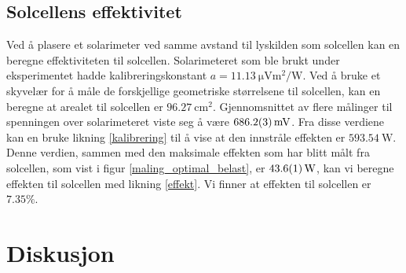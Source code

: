 \documentclass[%
 reprint,
 amsmath,amssymb,
 aps,
 norsk,
 booktabs
]{revtex4-1}
\begin{document}
\subsection{Solcellens effektivitet}
Ved å plasere et solarimeter ved samme avstand til lyskilden som solcellen kan en beregne effektiviteten til solcellen. Solarimeteret som ble brukt under eksperimentet hadde kalibreringskonstant $a=\SI{11.13}{\micro\volt\meter^2\per\watt}$. Ved å bruke et skyvelær for å måle de forskjellige geometriske størrelsene til solcellen, kan en beregne at arealet til solcellen er $\SI{96.27}{\centi\meter^2}$. Gjennomsnittet av flere målinger til spenningen over solarimeteret viste seg å være $\SI{686.2\pm0.3}{\milli\volt}$. Fra disse verdiene kan en bruke likning \eqref{kalibrering} til å vise at den innstråle effekten er
$\SI{593.54}{\watt}$. Denne verdien, sammen med den maksimale effekten som har blitt målt fra solcellen, som vist i figur \vref{maling_optimal_belast}, er $\SI{43.6\pm0.1}{\watt}$, kan vi beregne effekten til solcellen med likning \eqref{effekt}. Vi finner at effekten til solcellen er $7.35\%$.\\
\section{Diskusjon}
\end{document}
